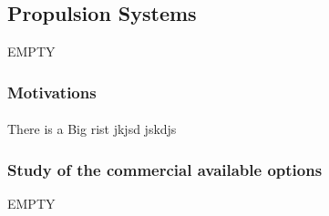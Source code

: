 \subsection{Propulsion Systems}

EMPTY

\subsubsection{Motivations}
\paragraph{}There is a Big rist
jkjsd
jskdjs

\subsubsection{Study of the commercial available options}
EMPTY

